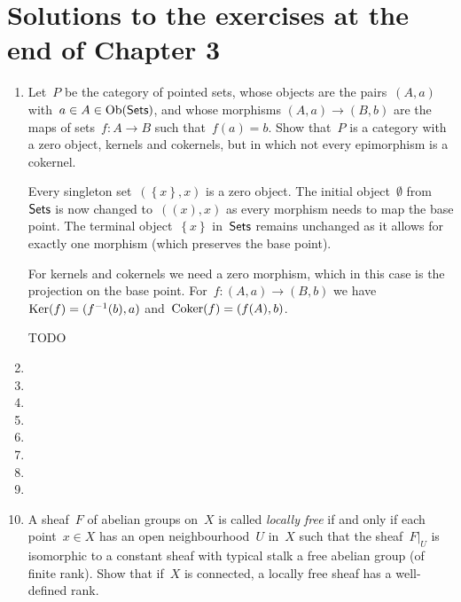 \documentclass[a4paper,11pt,oneside,openany,article]{memoir}
\begin{document}
\chapter{Solutions to the exercises at the end of Chapter 3}
\begin{enumerate}
  \item Let~$P$ be the category of pointed sets, whose objects are the pairs~$(A,a)$ with~$a\in A\in\operatorname{Ob}(\textsf{Sets})$, and whose morphisms $(A,a)\to(B,b)$ are the maps of sets~$f\colon A\to B$ such that~$f(a)=b$. Show that~$P$ is a category with a zero object, kernels and cokernels, but in which not every epimorphism is a cokernel.

    \begin{solution}
      Every singleton set~$(\left\{ x \right\},x)$ is a zero object. The initial object~$\emptyset$ from~$\textsf{Sets}$ is now changed to~$(\left( x \right),x)$ as every morphism needs to map the base point. The terminal object~$\left\{ x \right\}$ in~$\textsf{Sets}$ remains unchanged as it allows for exactly one morphism (which preserves the base point).

      For kernels and cokernels we need a zero morphism, which in this case is the projection on the base point. For~$f\colon(A,a)\to(B,b)$ we have~$\operatorname{Ker}(f)=(f^{-1}(b),a)$ and~$\operatorname{Coker}(f)=(f(A),b)$.

      TODO
    \end{solution}

  \item 

  \item 

  \item 

  \item 

  \item 

  \item 

  \item 

  \item 

  \item A sheaf~$F$ of abelian groups on~$X$ is called \emph{locally free} if and only if each point~$x\in X$ has an open neighbourhood~$U$ in~$X$ such that the sheaf~$F|_U$ is isomorphic to a constant sheaf with typical stalk a free abelian group (of finite rank). Show that if~$X$ is connected, a locally free sheaf has a well-defined rank.


\end{enumerate}
\end{document}
